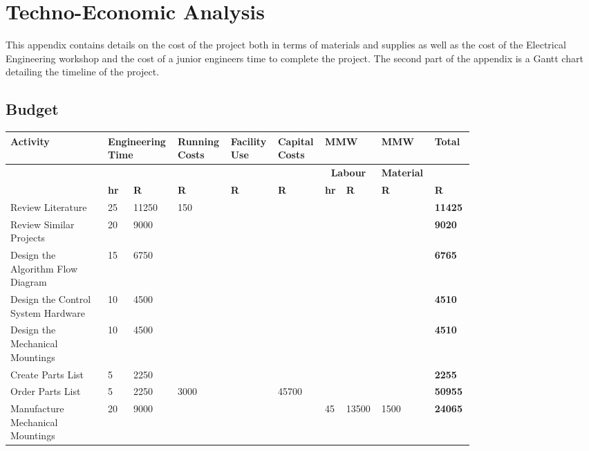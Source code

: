 
\chapter{Techno-Economic Analysis}
This appendix contains details on the cost of the project both in terms of materials and supplies as well as the cost of the Electrical Engineering workshop and the cost of a junior engineers time to complete the project. The second part of the appendix is a Gantt chart detailing the timeline of the project.\par
\newpage
\begin{landscape}
	\small
\section{Budget}
\begin{tabular}{|p{0.2\linewidth}|p{0.03\linewidth}|p{0.06\linewidth}|p{0.08\linewidth}|p{0.08\linewidth}|p{0.08\linewidth}|p{0.03\linewidth}|p{0.06\linewidth}|p{0.08\linewidth}|p{0.08\linewidth}|}
	\hline
	\textbf{Activity} & \multicolumn{2}{p{0.09\linewidth}|}{\textbf{Engineering Time}} & \textbf{Running Costs} & \textbf{Facility Use} & \textbf{Capital Costs} & \multicolumn{2}{p{0.09\linewidth}|}{\textbf{MMW}} & \textbf{MMW} & \textbf{Total} \\
	\hline
	&  &  &  &  &  & \multicolumn{2}{c|}{\textbf{Labour}} & \textbf{Material} &  \\
	\hline
	& \textbf{hr} & \textbf{R} & \textbf{R} & \textbf{R} & \textbf{R} & \textbf{hr} & \textbf{R} & \textbf{R} & \textbf{R} \\
	\hline
	Review Literature & 25 & 11250 & 150 &   &   &   &   &   & \textbf{11425} \\
	\hline
	Review Similar Projects & 20 & 9000 &   &   &   &   &   &   & \textbf{9020 }\\
	\hline
	Design the Algorithm Flow Diagram & 15 & 6750 &   &   &   &   &   &   & \textbf{6765 }\\
	\hline
	Design the Control System Hardware & 10 & 4500 &   &   &   &   &   &   & \textbf{4510}\\
	\hline
	Design the Mechanical Mountings & 10 & 4500 &   &   &   &   &   &   & \textbf{4510 }\\
	\hline
	Create Parts List & 5 & 2250 &   &   &   &   &   &   & \textbf{2255 }\\
	\hline
	Order Parts List & 5 & 2250 & 3000 &   & 45700 &   &   &   & \textbf{50955 }\\
	\hline
	Manufacture Mechanical Mountings & 20 & 9000 &   &   &   & 45 & 13500 & 1500 & \textbf{24065} \\

\end{tabular}
\end{landscape}
